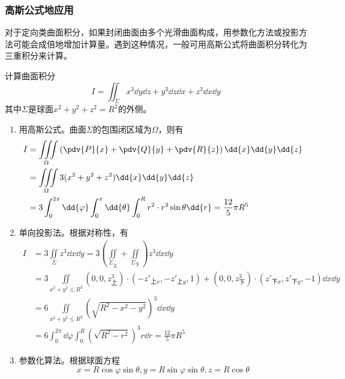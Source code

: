 \subsubsection{高斯公式地应用}
对于定向类曲面积分，如果封闭曲面由多个光滑曲面构成，用参数化方法或投影方法可能会成倍地增加计算量。遇到这种情况，一般可用高斯公式将曲面积分转化为三重积分来计算。
\begin{example}
    计算曲面积分
    \[ I =\iint_{\Sigma} x^3\dd{y}\dd{z} + y^3\dd{z}\dd{x} + z^3\dd{x}\dd{y} \]
    其中$\Sigma$是球面$x^2+y^2+z^2=R^2$的外侧。
\end{example}
\begin{solution}
    \begin{enumerate}[(1)]
        \item 用高斯公式。曲面$\Sigma$的包围闭区域为$\Omega$，则有
              \begin{align*}
                  I & = \iiint\limits_{\Omega} \left(\pdv{P}{x} + \pdv{Q}{y} + \pdv{R}{z}\right)\dd{x}\dd{y}\dd{z}                     \\
                    & =\iiint\limits_{\Omega} 3(x^2+y^2+z^2)\dd{x}\dd{y}\dd{z}                                                         \\
                    & =3\int_0^{2\pi}\dd{\varphi}\int_0^{\pi}\dd{\theta}\int_0^{R} r^2\cdot r^2\sin\theta \dd{r} = \frac{12}{5}\pi R^5
              \end{align*}
        \item 单向投影法。根据对称性，有
              \begin{align*}
                  I & = 3\iint\limits_\Sigma z^3\dd{x}\dd{y} =3\left(\iint\limits_{\Sigma_\text{上}}+\iint\limits_{\Sigma_\text{下}}\right)z^3\dd{x}\dd{y} \\
                    & = 3\iint\limits_{x^2+y^2\leq R^2} (0,0,z_\text{上}^3)\cdot(-z'_{\text{上}x},-z'_{\text{上}y},1)
                  + (0,0,z_\text{下}^3)\cdot(z'_{\text{下}x},z'_{\text{下}y},-1)\dd{x}\dd{y}                                                               \\
                    & = 6\iint\limits_{x^2+y^2\leq R^2} (\sqrt{R^2 - x^2 - y^2})^3 \dd{x}\dd{y}                                                            \\
                    & = 6\int_0^{2\pi}\dd{\varphi}\int_0^R \left(\sqrt{R^2 - r^2}\right)^3 r\dd{r} = \frac{12}{5}\pi R^5
              \end{align*}
        \item 参数化算法。根据球面方程
              \[ x=R\cos\varphi\sin\theta, y=R\sin\varphi\sin\theta, z=R\cos\theta \]

\end{enumerate}
\end{solution}
